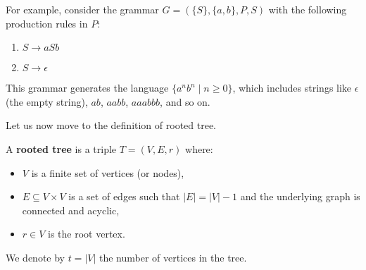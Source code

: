 \begin{example}
    For example, consider the grammar $G = (\{S\}, \{a, b\}, P, S)$ with the following production rules in $P$:
    \begin{enumerate}
        \item $S \rightarrow aSb$
        \item $S \rightarrow \epsilon$
    \end{enumerate}
    This grammar generates the language $\{a^n b^n \mid n \geq 0\}$, which includes strings like $\epsilon$ (the empty string), $ab$, $aabb$, $aaabbb$, and so on.
\end{example}

Let us now move to the definition of rooted tree.
\begin{definition}[Tree] \label{def:rooted_tree}
    A \textbf{rooted tree} is a triple $T = (V, E, r)$ where:
    \begin{itemize}
        \item $V$ is a finite set of vertices (or nodes),
        \item $E\subseteq V \times V$ is a set of edges such that $|E| = |V|-1$ and the underlying graph is connected and acyclic,
        \item $r\in V$ is the root vertex.
    \end{itemize}
\end{definition}

We denote by $t = |V|$ the number of vertices in the tree.


